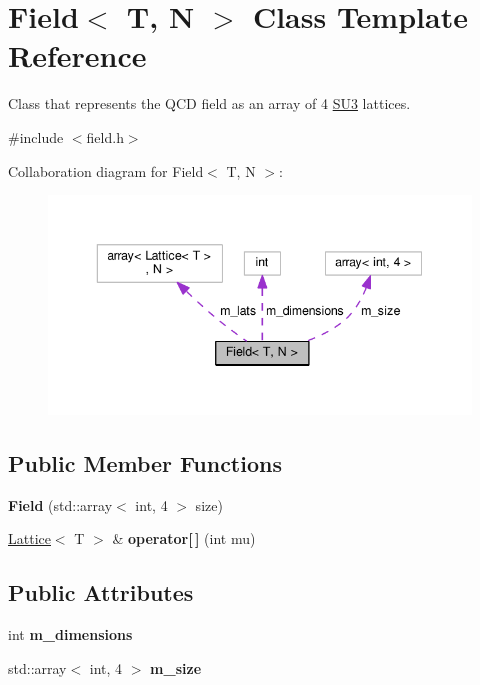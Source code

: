 \hypertarget{classField}{}\section{Field$<$ T, N $>$ Class Template Reference}
\label{classField}


Class that represents the Q\+CD field as an array of 4 \hyperlink{structSU3}{S\+U3} lattices.  




{\ttfamily \#include $<$field.\+h$>$}



Collaboration diagram for Field$<$ T, N $>$\+:\nopagebreak
\begin{figure}[H]
\begin{center}
\leavevmode
\includegraphics[width=343pt]{d3/d0e/classField__coll__graph}
\end{center}
\end{figure}
\subsection*{Public Member Functions}
\begin{DoxyCompactItemize}
\item 
{\bfseries Field} (std\+::array$<$ int, 4 $>$ size)\hypertarget{classField_a25a5869a0faa4d33782cbe9f277f684f}{}\label{classField_a25a5869a0faa4d33782cbe9f277f684f}

\item 
\hyperlink{classLattice}{Lattice}$<$ T $>$ \& {\bfseries operator\mbox{[}$\,$\mbox{]}} (int mu)\hypertarget{classField_a2c9ffced05a0a329395b2d9bca338840}{}\label{classField_a2c9ffced05a0a329395b2d9bca338840}

\end{DoxyCompactItemize}
\subsection*{Public Attributes}
\begin{DoxyCompactItemize}
\item 
int {\bfseries m\+\_\+dimensions}\hypertarget{classField_ada68c99dbc291529adcbc58c87273403}{}\label{classField_ada68c99dbc291529adcbc58c87273403}

\item 
std\+::array$<$ int, 4 $>$ {\bfseries m\+\_\+size}\hypertarget{classField_ae6a537c53432f6631a5e6eb624deea90}{}\label{classField_ae6a537c53432f6631a5e6eb624deea90}

\end{DoxyCompactItemize}

